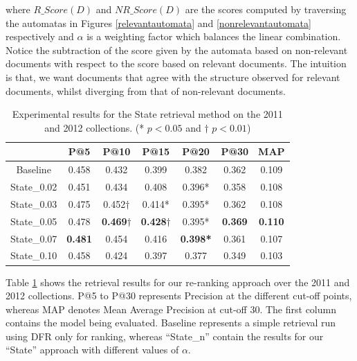 where \(R\_Score(D)\) and \(NR\_Score(D)\) are the scores computed by traversing the automatas in Figures \ref{relevantautomata} and \ref{nonrelevantautomata} respectively and \(\alpha\) is a weighting factor which balances the linear combination. Notice the subtraction of the score given by the automata based on non-relevant documents with respect to the score based on relevant documents. The intuition is that, we want documents that agree with the structure observed for relevant documents, whilst diverging from that of non-relevant documents.







\begin{table}
	\caption{Experimental results for the State retrieval method on the 2011 and 2012 collections. (* \(p<0.05\) and \(\dagger\) \(p<0.01\))}
	\centering
		\begin{tabular}{c|c|c|c|c|c|c}
			& P@5 & P@10 & P@15 & P@20 & P@30 & MAP \\
			\hline
			Baseline & 0.458 & 0.432 & 0.399 & 0.382 & 0.362 & 0.109 \\
			\hline
			State\_0.02 & 0.451 & 0.434 & 0.408 & 0.396* & 0.358  & 0.108 \\
			State\_0.03 & 0.475 & 0.452\(\dagger\) & 0.414* & 0.395* & 0.362  & 0.108  \\
			State\_0.05 & 0.478 & \textbf{0.469\(\dagger\)} & \textbf{0.428\(\dagger\)} & 0.395* & \textbf{0.369}  &\textbf{ 0.110} \\
			State\_0.07 & \textbf{0.481} & 0.454 & 0.416 & \textbf{0.398*} & 0.361 & 0.107 \\
			State\_0.10 & 0.458 & 0.424 & 0.397 & 0.377 & 0.349  & 0.103  \\
			\hline
		\end{tabular} 

	\label{AutomataResults}
	\vspace{0.5cm}
\end{table}





Table \ref{AutomataResults} shows the retrieval results for our re-ranking approach over the 2011 and 2012 collections. P@5 to P@30 represents Precision at the different cut-off points, whereas MAP denotes Mean Average Precision at cut-off 30. The first column contains the model being evaluated. Baseline represents a simple retrieval run using DFR only for ranking, whereas ``State\_n'' contain the results for our ``State'' approach with different values of \(\alpha\). 



